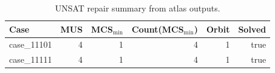 \begin{table}[t]
\centering
\small
\begin{tabular}{lrrrrr}
\toprule
Case & MUS & MCS$_{\min}$ & Count(MCS$_{\min}$) & Orbit & Solved \\
\midrule
case\_11101 & 4 & 1 & 4 & 1 & true \\
case\_11111 & 4 & 1 & 4 & 1 & true \\
\bottomrule
\end{tabular}
\caption{UNSAT repair summary from atlas outputs.}
\label{tab:sen24-repairs}
\end{table}
